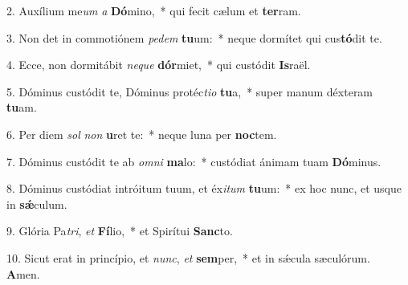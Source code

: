 2. Auxílium me\textit{um} \textit{a} \textbf{Dó}mino,~*  qui fecit cælum et \textbf{ter}ram.\

3. Non det in commotiónem \textit{pe}\textit{dem} \textbf{tu}um:~*  neque dormítet qui cus\textbf{tó}dit te.\

4. Ecce, non dormitábit \textit{ne}\textit{que} \textbf{dór}miet,~*  qui custódit \textbf{Is}raël.\

5. Dóminus custódit te, Dóminus protéc\textit{ti}\textit{o} \textbf{tu}a,~*  super manum déxteram \textbf{tu}am.\

6. Per diem \textit{sol} \textit{non} \textbf{u}ret te:~*  neque luna per \textbf{noc}tem.\

7. Dóminus custódit te ab \textit{om}\textit{ni} \textbf{ma}lo:~*  custódiat ánimam tuam \textbf{Dó}minus.\

8. Dóminus custódiat intróitum tuum, et éx\textit{i}\textit{tum} \textbf{tu}um:~*  ex hoc nunc, et usque in \textbf{sǽ}culum.\

9. Glória Pa\textit{tri}, \textit{et} \textbf{Fí}lio,~*  et Spirítui \textbf{Sanc}to.\

10. Sicut erat in princípio, et \textit{nunc}, \textit{et} \textbf{sem}per,~*  et in sǽcula sæculórum. \textbf{A}men.\

